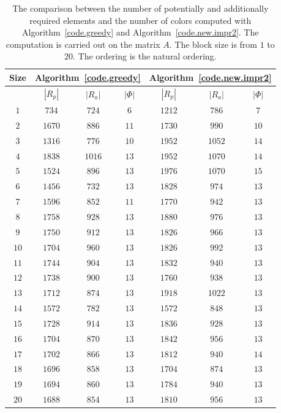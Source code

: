 \documentclass[12pt, twoside,a4paper,toc=bibliography]{scrbook}
\newcommand{\coderef}[1]{Algorithm~\protect\ref{#1}}
\begin{document}
\begin{table}
\centering
\begin{tabular}{|c|c|c|c|c|c|c|}
\hline
Size & \multicolumn{3}{c|}{\coderef{code.greedy}} & \multicolumn{3}{c|}{\coderef{code.new.impr2}}\\\hline
{} & $|R_p|$ & $|R_a|$ & $|\Phi|$ & $|R_p|$ & $|R_a|$ & $|\Phi|$\\\hline
$1$ & $734$ & $724$ & $6$ & $1212$ & $786$ & $7$\\\hline
$2$ & $1670$ & $886$ & $11$ & $1730$ & $990$ & $10$\\\hline
$3$ & $1316$ & $776$ & $10$ & $1952$ & $1052$ & $14$\\\hline
$4$ & $1838$ & $1016$ & $13$ & $1952$ & $1070$ & $14$\\\hline
$5$ & $1524$ & $896$ & $13$ & $1976$ & $1070$ & $15$\\\hline
$6$ & $1456$ & $732$ & $13$ & $1828$ & $974$ & $13$\\\hline
$7$ & $1596$ & $852$ & $11$ & $1770$ & $942$ & $13$\\\hline
$8$ & $1758$ & $928$ & $13$ & $1880$ & $976$ & $13$\\\hline
$9$ & $1750$ & $912$ & $13$ & $1826$ & $966$ & $13$\\\hline
$10$ & $1704$ & $960$ & $13$ & $1826$ & $992$ & $13$\\\hline
$11$ & $1744$ & $904$ & $13$ & $1832$ & $940$ & $13$\\\hline
$12$ & $1738$ & $900$ & $13$ & $1760$ & $938$ & $13$\\\hline
$13$ & $1712$ & $874$ & $13$ & $1918$ & $1022$ & $13$\\\hline
$14$ & $1572$ & $782$ & $13$ & $1572$ & $848$ & $13$\\\hline
$15$ & $1728$ & $914$ & $13$ & $1836$ & $928$ & $13$\\\hline
$16$ & $1704$ & $870$ & $13$ & $1842$ & $956$ & $13$\\\hline
$17$ & $1702$ & $866$ & $13$ & $1812$ & $940$ & $14$\\\hline
$18$ & $1696$ & $858$ & $13$ & $1704$ & $874$ & $13$\\\hline
$19$ & $1694$ & $860$ & $13$ & $1784$ & $940$ & $13$\\\hline
$20$ & $1688$ & $854$ & $13$ & $1810$ & $956$ & $13$\\\hline
\end{tabular}
\caption{The comparison between the number of potentially and additionally required
elements and the number of colors computed with \coderef{code.greedy} and \coderef{code.new.impr2}.
The computation is carried out on the matrix $A$.
The block size is from $1$ to $20$. The ordering is the natural ordering.}
\label{bls.greedy.new.carbon}
\end{table}
\end{document}
